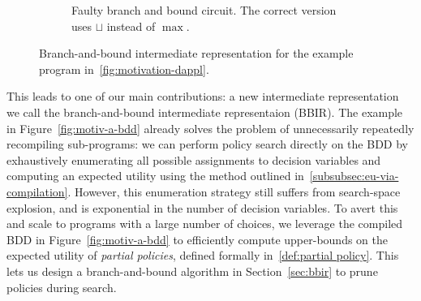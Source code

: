 \begin{figure}
\begin{subfigure}{0.4\linewidth}
{
  }
  \caption{Faulty branch and bound circuit. The correct version uses $\sqcup$ instead of $\max$.}
  \label{fig:bb circuit example}
  \end{subfigure}
\caption{Branch-and-bound intermediate representation for the example program in~\cref{fig:motivation-dappl}.}
\label{fig:bbir-for-motivation-dappl}
\end{figure}

This leads to one of our main contributions: a new intermediate representation we call
the branch-and-bound intermediate representaion (BBIR). The example in
Figure~\ref{fig:motiv-a-bdd} already solves the problem of unnecessarily
repeatedly recompiling sub-programs: we can perform policy search directly on
the BDD by exhaustively enumerating all possible assignments to decision
variables and computing an expected utility using the method outlined in~\cref{subsubsec:eu-via-compilation}.
However, this enumeration strategy still suffers from
search-space explosion, and is exponential in the number of decision variables.
To avert this and scale to \dappl{} programs with a large number of choices, we
leverage the compiled BDD in Figure~\ref{fig:motiv-a-bdd} to efficiently compute
upper-bounds on the expected utility of \emph{partial policies},
defined formally in~\ref{def:partial policy}.
This lets us
design a branch-and-bound algorithm in Section~\ref{sec:bbir} to prune
policies during search.

